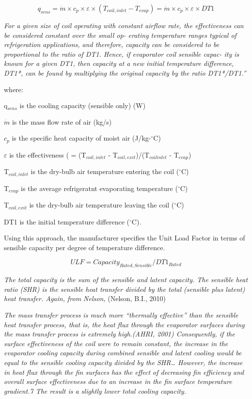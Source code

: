\begin{equation}
{q_{sens}} = \dot m \times {c_p} \times \varepsilon  \times ({T_{coil,inlet}} - {T_{evap}}) = \dot m \times {c_p} \times \varepsilon \times DT1
\end{equation}

\emph{For a given size of coil operating with constant airflow rate, the effectiveness can be considered constant over the small op- erating temperature ranges typical of refrigeration applications, and therefore, capacity can be considered to be proportional to the ratio of DT1. Hence, if evaporator coil sensible capac- ity is known for a given DT1, then capacity at a new initial temperature difference, DT1*, can be found by multiplying the original capacity by the ratio DT1*/DT1.''}

where:

q\(_{sens}\) is the cooling capacity (sensible only) (W)

\(\dot m\) is the mass flow rate of air (kg/s)

\({c_p}\) is the specific heat capacity of moist air (J/kg-\(^{\circ}\)C)

\(\varepsilon\) is the effectiveness ( = (T\(_{coil,inlet}\) - T\(_{coil,exit}\))/(T\(_{coilinlet}\) - T\(_{evap}\))

T\(_{coil,inlet}\) is the dry-bulb air temperature entering the coil (\(^{\circ}\)C)

T\(_{evap}\) is the average refrigeratnt evaporating temperature (\(^{\circ}\)C)

T\(_{coil,exit}\) is the dry-bulb air temperature leaving the coil (\(^{\circ}\)C)

DT1 is the initial temperature difference (\(^{\circ}\)C).

Using this approach, the manufacturer specifies the Unit Load Factor in terms of sensible capacity per degree of temperature difference.

\begin{equation}
ULF = Capacit{y_{Rated,Sensible}}/DT{1_{Rated}}
\end{equation}

\emph{The total capacity is the sum of the sensible and latent capacity. The sensible heat ratio (SHR) is the sensible heat transfer divided by the total (sensible plus latent) heat transfer. Again, from Nelson,} (Nelson, B.I., 2010)

\emph{The mass transfer process is much more ``thermally effective'' than the sensible heat transfer process, that is, the heat flux through the evaporator surfaces during the mass transfer process is extremely high.(AHRI, 2001) Consequently, if the surface effectiveness of the coil were to remain constant, the increase in the evaporator cooling capacity during combined sensible and latent cooling would be equal to the sensible cooling capacity divided by the SHR\ldots{} However, the increase in heat flux through the fin surfaces has the effect of decreasing fin efficiency and overall surface effectiveness due to an increase in the fin surface temperature gradient.7 The result is a slightly lower total cooling capacity.}

